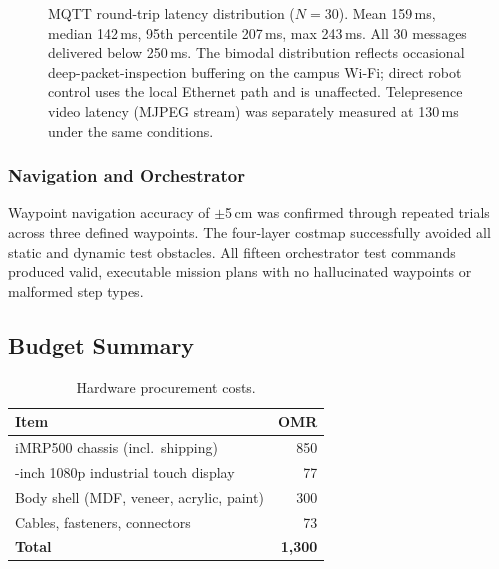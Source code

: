\documentclass[11pt,a4paper]{article}
\begin{document}
\begin{figure}[H]
\centering
{}
\caption{MQTT round-trip latency distribution ($N=30$). Mean 159\,ms, median 142\,ms, 95th percentile 207\,ms, max 243\,ms. All 30 messages delivered below 250\,ms. The bimodal distribution reflects occasional deep-packet-inspection buffering on the campus Wi-Fi; direct robot control uses the local Ethernet path and is unaffected. Telepresence video latency (MJPEG stream) was separately measured at 130\,ms under the same conditions.}
\label{fig:mqtt_hist}
\end{figure}

\subsubsection{Navigation and Orchestrator}

Waypoint navigation accuracy of $\pm$5\,cm was confirmed through repeated trials across three defined waypoints. The four-layer costmap successfully avoided all static and dynamic test obstacles. All fifteen orchestrator test commands produced valid, executable mission plans with no hallucinated waypoints or malformed step types.

\subsection{Budget Summary}

\begin{table}[H]
\centering
\small
\caption{Hardware procurement costs.}
\label{tab:budget}
\setlength{\tabcolsep}{6pt}
\begin{tabular}{@{} >{\raggedright\arraybackslash}p{6.0cm} r @{}}
\toprule
\textbf{Item} & \textbf{OMR} \\
\midrule
iMRP500 chassis (incl.\ shipping)         & 850 \\
10-inch 1080p industrial touch display    & 77 \\
Body shell (MDF, veneer, acrylic, paint)  & 300 \\
Cables, fasteners, connectors             & 73 \\
\midrule
\textbf{Total}                            & \textbf{1{,}300} \\
\bottomrule
\end{tabular}
\end{table}
\end{document}

